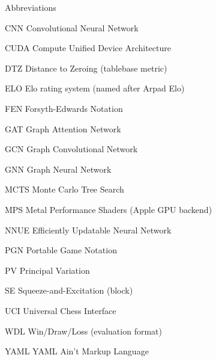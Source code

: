 
\begin{dictionary}{Abbreviations}
\item[CNN]  Convolutional Neural Network
\item[CUDA] Compute Unified Device Architecture
\item[DTZ]  Distance to Zeroing (tablebase metric)
\item[ELO]  Elo rating system (named after Arpad Elo)
\item[FEN]  Forsyth-Edwards Notation
\item[GAT]  Graph Attention Network
\item[GCN]  Graph Convolutional Network
\item[GNN]  Graph Neural Network
\item[MCTS] Monte Carlo Tree Search
\item[MPS]  Metal Performance Shaders (Apple GPU backend)
\item[NNUE] Efficiently Updatable Neural Network
\item[PGN]  Portable Game Notation
\item[PV]   Principal Variation
\item[SE]   Squeeze-and-Excitation (block)
\item[UCI]  Universal Chess Interface
\item[WDL]  Win/Draw/Loss (evaluation format)
\item[YAML] YAML Ain't Markup Language
\end{dictionary}
